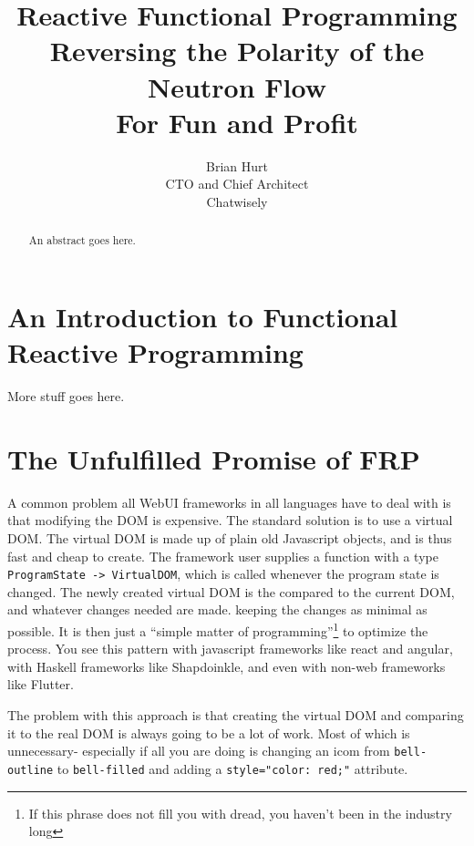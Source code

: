 \documentclass{article}
\begin{document}
\title{Reactive Functional Programming \\
{\Large Reversing the Polarity of the Neutron Flow} \\
{\large For Fun and Profit} }
\author{Brian Hurt \\
CTO and Chief Architect \\
Chatwisely}

\maketitle

\begin{abstract}
An abstract goes here.
\end{abstract}

\section{An Introduction to Functional Reactive Programming}

More stuff goes here.

\section{The Unfulfilled Promise of FRP}

A common problem all WebUI frameworks in all languages have to deal with
is that modifying the DOM is expensive.  The standard solution is to
use a virtual DOM.  The virtual DOM is made up of plain old Javascript
objects, and is thus fast and cheap to create.  The framework user
supplies a function with a type \verb|ProgramState -> VirtualDOM|, which
is called whenever the program state is changed.  The newly created
virtual DOM is the compared to the current DOM, and whatever changes
needed are made. keeping the changes as minimal as possible.  It is then
just a ``simple matter of programming''\footnote{If this phrase does not
fill you with dread, you haven't been in the industry long} to optimize
the process.  You see this pattern with javascript frameworks like react
and angular, with Haskell frameworks like Shapdoinkle, and even with
non-web frameworks like Flutter.

The problem with this approach is that creating the virtual DOM and
comparing it to the real DOM is always going to be a lot of work.  Most
of which is unnecessary- especially if all you are doing is changing
an icom from \verb|bell-outline| to \verb|bell-filled| and adding a
\verb|style="color: red;"| attribute.
\end{document}
